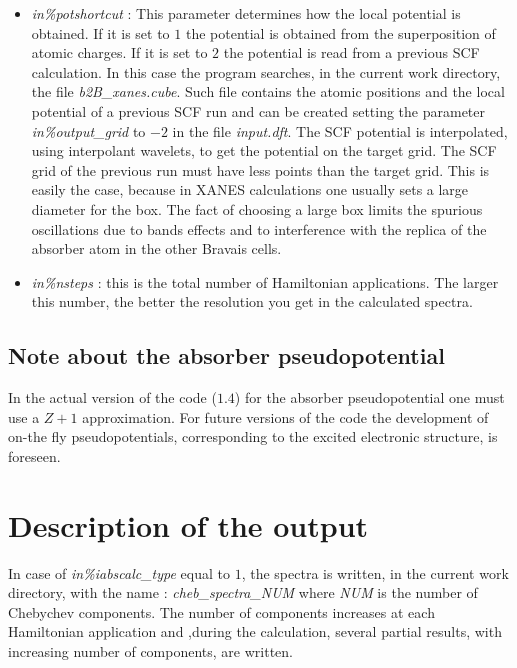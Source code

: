 \documentclass[a4paper,11pt]{report}
\begin{document}
\begin{itemize}
\item   {\it in\%potshortcut } : This parameter determines how the 
local potential is obtained. If it is set to $1$ the potential is
obtained from the superposition of atomic charges.
If it is set to $2$ the potential is read from a previous SCF
calculation. In this case the program searches, in the current work directory,
the file {\it b2B\_xanes.cube}. Such file contains the atomic positions
and the local potential of a previous SCF run and can be created
setting the parameter {\it in\%output\_grid} to $-2$ in
the file {\it input.dft}. The SCF potential is interpolated, using
interpolant wavelets, to get the potential on the target grid.
The SCF grid of the previous run must have less points than the target
grid.
This is easily the case, because in XANES calculations one usually
sets a large diameter for the box. The fact of choosing a large box 
limits the spurious oscillations due to bands effects and to interference with the replica
of the absorber atom in the other Bravais cells. 

\item {\it in\%nsteps } : this is the total number of Hamiltonian
  applications. The larger this number, the better the resolution you get
  in the calculated spectra.

\end{itemize}


\subsection{Note about the absorber pseudopotential}
 In the actual version of the code ($1.4$) for the absorber
pseudopotential one must use a $Z+1$ approximation.
For future versions of the code the development of on-the fly
pseudopotentials, corresponding to the excited electronic structure,
is foreseen.


\section{Description of the output}

In case of  {\it in\%iabscalc\_type} equal to  $1$, the spectra
is written, in the current work directory, with the name :
{\it  cheb\_spectra\_NUM  } where {\it NUM} is the number of 
Chebychev components. The number of components increases
at each Hamiltonian application and ,during the calculation,
 several partial results, with increasing number of components,
 are written.
\end{document}
